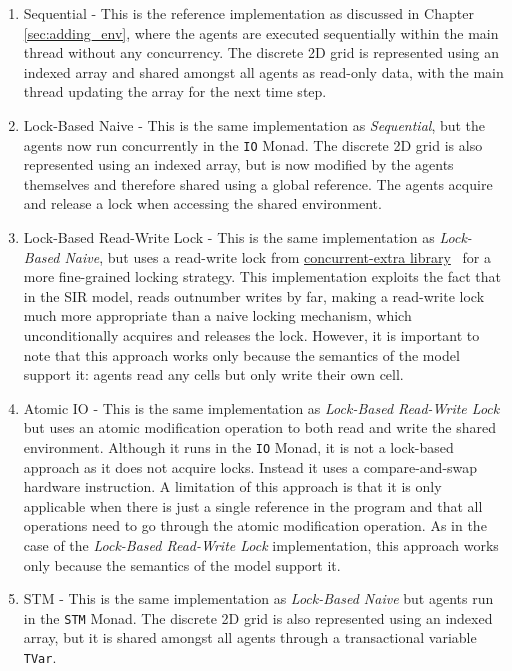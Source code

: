 \begin{enumerate}
	\item Sequential - This is the reference implementation as discussed in Chapter \ref{sec:adding_env}, where the agents are executed sequentially within the main thread without any concurrency. The discrete 2D grid is represented using an indexed array \cite{array_hackage} and shared amongst all agents as read-only data, with the main thread updating the array for the next time step.
		
	\item Lock-Based Naive - This is the same implementation as \textit{Sequential}, but the agents now run concurrently in the \texttt{IO} Monad. The discrete 2D grid is also represented using an indexed array, but is now modified by the agents themselves and therefore shared using a global reference. The agents acquire and release a lock when accessing the shared environment.

	\item Lock-Based Read-Write Lock - This is the same implementation as \textit{Lock-Based Naive}, but uses a read-write lock from \href{http://hackage.haskell.org/package/concurrent-extra}{concurrent-extra library}~\cite{concurrent_extra_library} for a more fine-grained locking strategy. This implementation exploits the fact that in the SIR model, reads outnumber writes by far, making a read-write lock much more appropriate than a naive locking mechanism, which unconditionally acquires and releases the lock. However, it is important to note that this approach works only because the semantics of the model support it: agents read any cells but only write their own cell. 
	
	\item Atomic IO - This is the same implementation as \textit{Lock-Based Read-Write Lock} but uses an atomic modification operation to both read and write the shared environment. Although it runs in the \texttt{IO} Monad, it is not a lock-based approach as it does not acquire locks. Instead it uses a compare-and-swap hardware instruction. A limitation of this approach is that it is only applicable when there is just a single reference in the program and that all operations need to go through the atomic modification operation. As in the case of the \textit{Lock-Based Read-Write Lock} implementation, this approach works only because the semantics of the model support it. 
	
	\item STM - This is the same implementation as \textit{Lock-Based Naive} but agents run in the \texttt{STM} Monad. The discrete 2D grid is also represented using an indexed array, but it is shared amongst all agents through a transactional variable \texttt{TVar}.
	
\end{enumerate}

